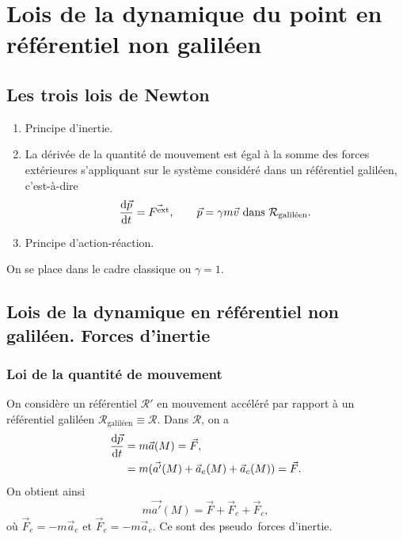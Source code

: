 \section[Lois de la dynamique du point]{Lois de la dynamique du point en référentiel non galiléen}

    \subsection{Les trois lois de Newton}

        \begin{enumerate}[label=\arabic*.]
            \item Principe d'inertie.
            \item La dérivée de la quantité de mouvement est égal à la somme des forces extérieures s'appliquant sur le système considéré dans un référentiel galiléen, c'est-à-dire
            \begin{equation*}
                \frac{\mathrm{d}\vec{p}}{\mathrm{d} t}=\vec{F^{\text{ext}}},\qquad \vec{p}=\gamma m\vec{v}\text{ dans }\mathcal{R}_{\text{galiléen}}.
            \end{equation*}
            \item Principe d'action-réaction.
        \end{enumerate}
        On se place dans le cadre classique ou $\gamma=1$.
    
    \subsection{Lois de la dynamique en référentiel non galiléen. Forces d'inertie}
        \subsubsection{Loi de la quantité de mouvement}

            On considère un référentiel $\mathcal{R}'$ en mouvement accéléré par rapport à un référentiel galiléen $\mathcal{R}_{\text{galiléen}}\equiv\mathcal{R}$. Dans $\mathcal{R}$, on a 
            \begin{align*}
                \frac{\mathrm{d}\vec{p}}{\mathrm{d} t}
                &=
                m\vec{a}(M)=\vec{F},\\
                &=m(\vec{a'}(M)+\vec{a}_e(M)+\vec{a}_c(M))=\vec{F}.
            \end{align*}
            On obtient ainsi
            \begin{equation*}
                m\vec{a'}(M)=\vec{F}+\vec{F}_e+\vec{F}_c,
            \end{equation*}
            où $\vec{F}_e=-m\vec{a}_e$ et $\vec{F}_e=-m\vec{a}_e$. Ce sont des \og pseudo\fg~forces d'inertie.

